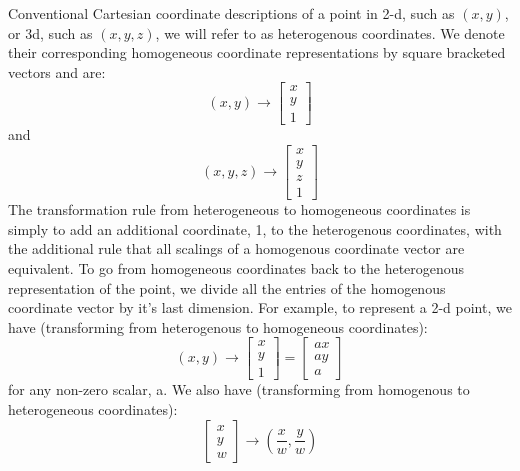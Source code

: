 Conventional Cartesian coordinate descriptions of a point in 2-d, such as $(x,y)$, or 3d, such as $(x,y,z)$, we will refer to as heterogenous coordinates.  We denote their corresponding homogeneous coordinate representations by square bracketed vectors and are:
\begin{equation}
    (x,y) \rightarrow 
    \left [
    \begin{array}{c}
    x \\
    y \\
    1
    \end{array}
    \right ]
    \label{eq:2dhomo}
\end{equation}
and
\begin{equation}
    (x,y,z) \rightarrow 
    \left [
    \begin{array}{c}
    x \\
    y \\
    z \\
    1
    \end{array}
    \right ]
    \label{eq:3dhomo}
\end{equation}
The transformation rule from heterogeneous to homogeneous coordinates is simply to add an additional coordinate, 1, to the heterogenous coordinates, with the additional rule that all scalings of a homogenous coordinate vector are equivalent.  To go from homogeneous coordinates back to the heterogenous representation of the point, we divide all the entries of the homogenous coordinate vector by it's last dimension.  For example, to represent a 2-d point, we have (transforming from heterogenous to homogeneous coordinates):
\begin{equation}
    (x,y) \rightarrow 
        \left [
    \begin{array}{c}
    x \\
    y \\
    1
    \end{array}
    \right ]
    =
        \left [
    \begin{array}{c}
    a x \\
    a y \\
    a
    \end{array}
    \right ]
\end{equation}
for any non-zero scalar, a.
We also have (transforming from homogenous to heterogeneous coordinates):
\begin{equation}
        \left [
    \begin{array}{c}
    x \\
    y \\
    w
    \end{array}
    \right ]
    \rightarrow 
     \left ( \frac{x}{w}, \frac{y}{w} \right )
\end{equation}


